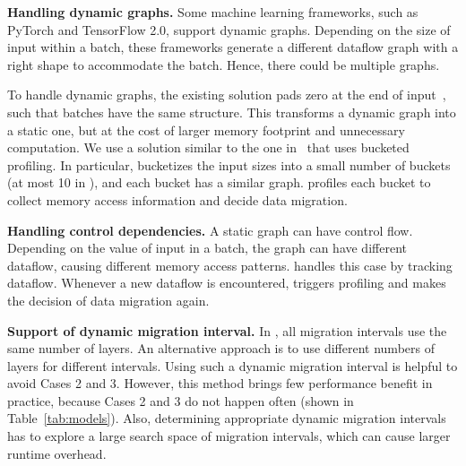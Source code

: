 \textbf{Handling dynamic graphs.}
Some machine learning frameworks, such as PyTorch and TensorFlow 2.0, support dynamic graphs. \textcolor{check}{Depending on the size of input within a batch, these frameworks generate a different dataflow graph with a right shape to accommodate the batch}.
Hence, there could be multiple graphs. 

To handle dynamic graphs, the existing solution pads zero at the end of input~\cite{google_tensorflow_bucketing}, such that batches have the same structure. This transforms a dynamic graph into a static one, but at the cost of larger memory footprint and unnecessary computation. We use a solution similar to the one in~\cite{DBLP:conf/asplos/SivathanuCSZ19} that uses bucketed profiling. In particular, \name bucketizes the input sizes into a small  \textcolor{dong2}{number} of buckets (at most 10 in \name
), and each bucket has a similar graph. \name profiles each bucket to collect memory access information and decide data migration. 


\textbf{Handling control dependencies.}
A static graph can have control flow. Depending on the value of input in a batch, the graph can have different dataflow, causing different memory access patterns. \name handles this case by tracking dataflow. Whenever a new dataflow is encountered, \name triggers profiling and makes the decision of data migration again. 

\textcolor{check}{\textbf{Support of dynamic migration interval.} In \name, all migration intervals use the same number of layers. An alternative approach is to use different numbers of layers for different intervals. Using such a dynamic migration interval is helpful to avoid Cases 2 and 3. However, this method brings few performance benefit in practice, because Cases 2 and 3 do not happen often (shown in Table~\ref{tab:models}). Also, determining appropriate dynamic migration intervals has to explore a large search space of migration intervals, which can cause larger runtime overhead.}